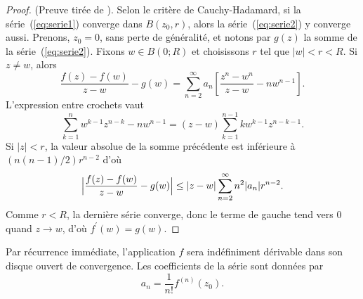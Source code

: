 \begin{proof}{(Preuve tirée de \cite{rudin1988analyse}).}
Selon le critère de Cauchy-Hadamard, si la série~(\ref{eq:serie1}) converge dans $B(z_0,r)$, alors la série~(\ref{eq:serie2}) y converge aussi. 
Prenons, $z_0=0$, sans perte de généralité, et notons par $g(z)$ la somme de la série~(\ref{eq:serie2}). Fixons $w \in B(0 ; R)$ et choisissons $r$ tel que $\lvert w \rvert < r <R$. Si $z \neq w$, alors
\[\frac{f(z) - f(w)}{z-w}-g(w)=\sum_{n=2}^\infty a_n \left[  \frac{z^n-w^n}{z-w} - n w^{n-1}\right].\]
L'expression entre crochets vaut
\[\sum_{k=1}^n w^{k-1}z^{n-k} - n w^{n-1} = (z-w) \sum_{k=1}^{n-1} k w^{k-1}z^{n-k-1}.\]
Si $\lvert z \rvert <r$, la valeur absolue de la somme précédente est inférieure à $\left(n(n-1)/2\right) r^{n-2}$
d'où
\[\Bigl | \frac{f(z) - f(w)}{z-w}-g(w) \Bigr |  \leq \lvert z-w \rvert \sum_{n=2}^\infty n^2 \lvert a_n \rvert r^{n-2}.\]
Comme $r<R$, la dernière série converge, donc le terme de gauche tend vers $0$ quand $z \to w$, d'où $f^\prime(w)=g(w)$. 
\end{proof}

Par récurrence immédiate, l'application $f$ sera indéfiniment dérivable dans son disque ouvert de convergence. Les coefficients de la série sont données par
\[a_n=\frac{1}{n!}f^{(n)}(z_0).\] 


